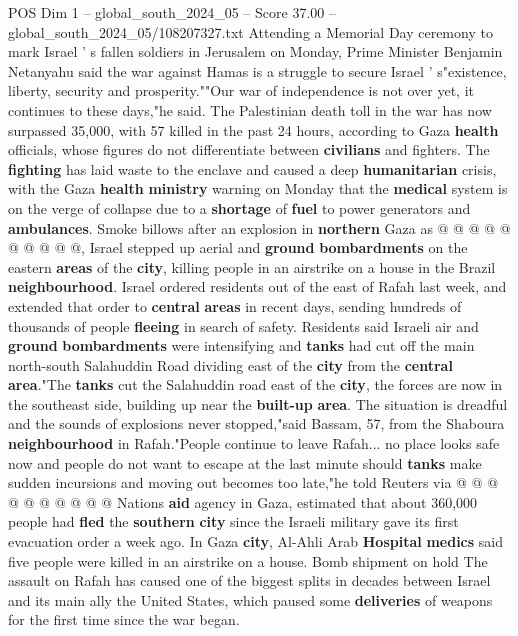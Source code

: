 \begin{textsample}{POS Dim 1 – global\_south\_2024\_05 – Score 37.00 – global\_south\_2024\_05/108207327.txt}
Attending a Memorial Day ceremony to mark Israel ' s fallen soldiers in Jerusalem on Monday, Prime Minister Benjamin Netanyahu said the war against Hamas is a struggle to secure Israel ' s"existence, liberty, security and prosperity.""Our war of independence is not over yet, it continues to these days,"he said.
The Palestinian death toll in the war has now surpassed 35,000, with 57 killed in the past 24 hours, according to Gaza \textbf{health} officials, whose figures do not differentiate between \textbf{civilians} and fighters.
The \textbf{fighting} has laid waste to the enclave and caused a deep \textbf{humanitarian} crisis, with the Gaza \textbf{health} \textbf{ministry} warning on Monday that the \textbf{medical} system is on the verge of collapse due to a \textbf{shortage} of \textbf{fuel} to power generators and \textbf{ambulances}.
Smoke billows after an explosion in \textbf{northern} Gaza as @ @ @ @ @ @ @ @ @ @, Israel stepped up aerial and \textbf{ground} \textbf{bombardments} on the eastern \textbf{areas} of the \textbf{city}, killing people in an airstrike on a house in the Brazil \textbf{neighbourhood}.
Israel ordered residents out of the east of Rafah last week, and extended that order to \textbf{central} \textbf{areas} in recent days, sending hundreds of thousands of people \textbf{fleeing} in search of safety.
Residents said Israeli air and \textbf{ground} \textbf{bombardments} were intensifying and \textbf{tanks} had cut off the main north-south Salahuddin Road dividing east of the \textbf{city} from the \textbf{central} \textbf{area}."The \textbf{tanks} cut the Salahuddin road east of the \textbf{city}, the forces are now in the southeast side, building up near the \textbf{built-up} \textbf{area}.
The situation is dreadful and the sounds of explosions never stopped,"said Bassam, 57, from the Shaboura \textbf{neighbourhood} in Rafah."People continue to leave Rafah... no place looks safe now and people do not want to escape at the last minute should \textbf{tanks} make sudden incursions and moving out becomes too late,"he told Reuters via @ @ @ @ @ @ @ @ @ @ Nations \textbf{aid} agency in Gaza, estimated that about 360,000 people had \textbf{fled} the \textbf{southern} \textbf{city} since the Israeli military gave its first evacuation order a week ago.
In Gaza \textbf{city}, Al-Ahli Arab \textbf{Hospital} \textbf{medics} said five people were killed in an airstrike on a house.
Bomb shipment on hold The assault on Rafah has caused one of the biggest splits in decades between Israel and its main ally the United States, which paused some \textbf{deliveries} of weapons for the first time since the war began.

\end{textsample}
